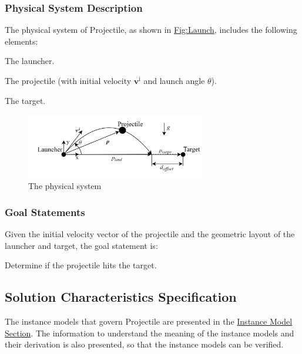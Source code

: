 \documentclass[12pt]{article}
\begin{document}
\subsubsection{Physical System Description}
\label{Sec:PhysSyst}
The physical system of Projectile, as shown in \hyperref[Figure:Launch]{Fig:Launch}, includes the following elements:

\begin{description}[font=\normalfont]
\item[PS1:]{The launcher.}
\item[PS2:]{The projectile (with initial velocity ${\symbf{v}^{\text{i}}}$ and launch angle $θ$).}
\item[PS3:]{The target.}
\end{description}
\begin{figure}[H]
\begin{center}
\includegraphics[width=0.7\textwidth]{../../../../datafiles/projectile/Launch.jpg}
\caption{The physical system}
\label{Figure:Launch}
\end{center}
\end{figure}
\subsubsection{Goal Statements}
\label{Sec:GoalStmt}
Given the initial velocity vector of the projectile and the geometric layout of the launcher and target, the goal statement is:

\begin{description}[font=\normalfont]
\item[targetHit:\phantomsection\label{targetHit}]{Determine if the projectile hits the target.}
\end{description}
\subsection{Solution Characteristics Specification}
\label{Sec:SolCharSpec}
The instance models that govern Projectile are presented in the \hyperref[Sec:IMs]{Instance Model Section}. The information to understand the meaning of the instance models and their derivation is also presented, so that the instance models can be verified.
\end{document}
